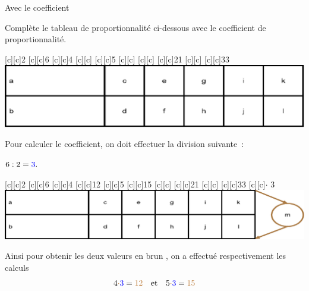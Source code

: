 \documentclass[a4paper,11pt]{report}
\begin{document}
\begin{resolu}{Avec le coefficient}{Complète le tableau de proportionnalité ci-dessous avec le coefficient de proportionnalité.
	\vspace{-0.3cm}
\begin{center}
[c][c]{2}
[c][c]{6}
[c][c]{4}
[c][c]{}
[c][c]{5}
[c][c]{}
[c][c]{}
[c][c]{21}
[c][c]{}
[c][c]{33}
\includegraphics[scale=.9]{media/fa-30/tableaun.eps}
\end{center}
{\color{blue}
Pour calculer le coefficient, on doit effectuer la division suivante~: 

$6\div2 ={\color{blue}3}.$

	\vspace{-0.8cm}
\begin{center}
[c][c]{2}
[c][c]{6}
[c][c]{4}
[c][c]{\color{brown}12}
[c][c]{5}
[c][c]{\color{brown}15}
[c][c]{}
[c][c]{21}
[c][c]{}
[c][c]{33}
[c][c]{{\Large\color{brown}$\cdot$} {\color{blue}3}}
\includegraphics[scale=.9]{media/fa-30/tableaucoeffn.eps}
\end{center}
Ainsi pour obtenir les deux valeurs en brun , on a effectué respectivement les calculs $$ 4 {\color{brown}\cdot} {\color{blue}3}= {\color{brown}12} \quad\mbox{et}\quad 5 {\color{brown}\cdot} {\color{blue}3}= {\color{brown}15}$$

}}
\end{resolu}
\end{document}
